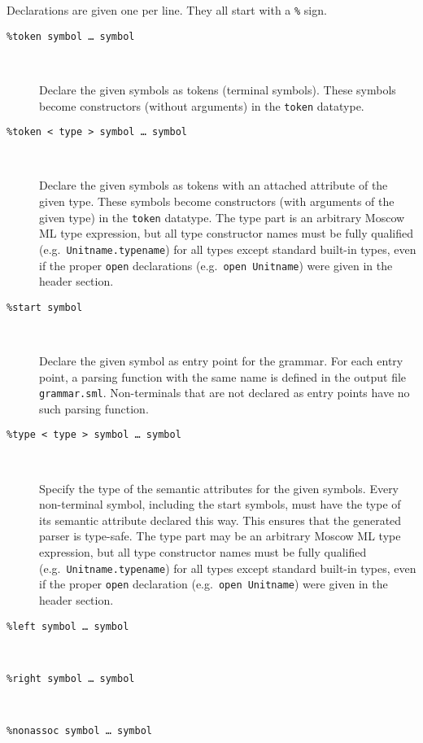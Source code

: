 \documentclass[fleqn,a4paper]{article}
\begin{document}
Declarations are given one per line.  They all start with a \verb#%# sign.

\begin{description}
\item[{\tt \%token {\rm symbol \ldots\ symbol}}]\mbox{ }

  Declare the given symbols as tokens (terminal symbols).  These
  symbols become constructors (without arguments) in the {\tt token}
  datatype.

\item[{\tt \%token < {\rm type} >  {\rm symbol \ldots\ symbol}}]\mbox{
    }

  Declare the given symbols as tokens with an attached attribute of
  the given type.  These symbols become constructors (with arguments
  of the given type) in the {\tt token} datatype.  The type part is an
  arbitrary Moscow ML type expression, but all type constructor names
  must be fully qualified (e.g.\ {\tt Unitname.typename}) for all
  types except standard built-in types, even if the proper {\tt open}
  declarations (e.g.\ {\tt open Unitname}) were given in the header
  section.  

\item[{\tt \%start {\rm symbol}}]\mbox{ }

  Declare the given symbol as entry point for the grammar.  For each
  entry point, a parsing function with the same name is defined in the
  output file {\tt grammar.sml}.  Non-terminals that are not declared
  as entry points have no such parsing function.  

\item[{\tt \%type < {\rm type} >  {\rm symbol \ldots\ symbol}}]\mbox{
    }

  Specify the type of the semantic attributes for the given symbols.
  Every non-terminal symbol, including the start symbols, must have
  the type of its semantic attribute declared this way.  This ensures
  that the generated parser is type-safe.  The type part may be an
  arbitrary Moscow ML type expression, but all type constructor names
  must be fully qualified (e.g.\ {\tt Unitname.typename}) for all
  types except standard built-in types, even if the proper {\tt open}
  declaration (e.g.\ {\tt open Unitname}) were given in the header
  section.  

\item[{\tt \%left {\rm symbol \ldots\ symbol}}]\mbox{ }
\item[{\tt \%right {\rm symbol \ldots\ symbol}}]\mbox{ }
\item[{\tt \%nonassoc {\rm symbol \ldots\ symbol}}]\mbox{ }


\end{description}
\end{document}
